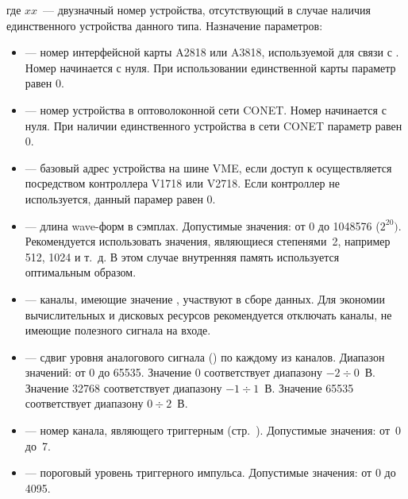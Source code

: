 \medskip

\noindent где $xx$~--- двузначный номер устройства, отсутствующий в случае наличия единственного устройства данного типа. Назначение параметров:

\begin{itemize}

\item {} --- номер интерфейсной карты A2818 или A3818, используемой для связи с \DEVICE{}. Номер начинается с нуля. При использовании единственной карты параметр равен 0.

\item {} --- номер устройства в оптоволоконной сети CONET. Номер начинается с нуля. При наличии единственного устройства в сети CONET параметр равен 0.

\item {} --- базовый адрес устройства на шине VME, если доступ к \DEVICE{} осуществляется посредством контроллера V1718 или V2718. Если контроллер не используется, данный парамер равен 0.

\item {} --- длина wave-форм в сэмплах. Допустимые значения: от 0 до 1048576 ($2^{20})$. Рекомендуется использовать значения, являющиеся степенями~2, например 512, 1024 и т.~д. В этом случае внутренняя память \DEVICE{} используется оптимальным образом.

\item {} --- каналы, имеющие значение , участвуют в сборе данных. Для экономии вычислительных и дисковых ресурсов рекомендуется отключать каналы, не имеющие полезного сигнала на входе.

\item {} --- сдвиг уровня аналогового сигнала () \cite{CaenUM3051AIS} по каждому из каналов. Диапазон значений: от 0 до 65535. Значение 0 соответствует диапазону $-2 \div 0$~В. Значение 32768 соответствует диапазону $-1 \div 1$~В. Значение 65535 соответствует диапазону $0 \div 2$~В. 

\item {} --- номер канала, являющего триггерным (стр.~\pageref{sec_basic}). Допустимые значения: от~0 до~7.

\item {} --- пороговый уровень триггерного импульса. Допустимые значения: от 0 до 4095.


\end{itemize}
